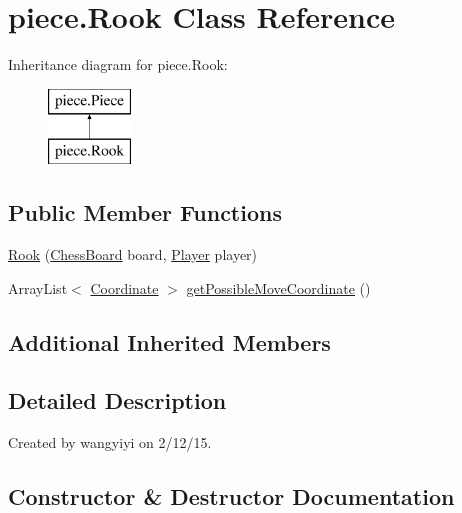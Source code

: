 \hypertarget{classpiece_1_1_rook}{}\section{piece.\+Rook Class Reference}
\label{classpiece_1_1_rook}
Inheritance diagram for piece.\+Rook\+:\begin{figure}[H]
\begin{center}
\leavevmode
\includegraphics[height=2.000000cm]{classpiece_1_1_rook}
\end{center}
\end{figure}
\subsection*{Public Member Functions}
\begin{DoxyCompactItemize}
\item 
\hyperlink{classpiece_1_1_rook_a0a79f7132a0afa353f13cb3a526e8bc7}{Rook} (\hyperlink{classchessboard_1_1_chess_board}{Chess\+Board} board, \hyperlink{enumchessboard_1_1_player}{Player} player)
\item 
Array\+List$<$ \hyperlink{classpiece_1_1_coordinate}{Coordinate} $>$ \hyperlink{classpiece_1_1_rook_ae4bd548b81c1224b1db56517315063aa}{get\+Possible\+Move\+Coordinate} ()
\end{DoxyCompactItemize}
\subsection*{Additional Inherited Members}


\subsection{Detailed Description}
Created by wangyiyi on 2/12/15. 

\subsection{Constructor \& Destructor Documentation}
\hypertarget{classpiece_1_1_rook_a0a79f7132a0afa353f13cb3a526e8bc7}{}
